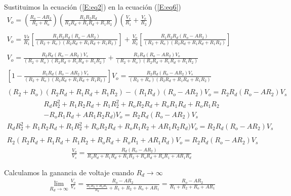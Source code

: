 \documentclass[12pt,a4paper]{article}
\begin{document}
	Sustituimos la ecuación (\ref{E:eq2}) en la ecuación (\ref{E:eq6})
	\begin{align}
		\label{E:eq}
		V_o = \left( \frac{R_o - AR_2}{R_2 + R_o} \right)\left( \frac{ R_1R_2R_d }{ R_2R_d + R_1R_d + R_1R_2 } \right)  \left( \frac{V_s}{R_1} + \frac{V_o}{R_2}\right)\nonumber\\\nonumber\\
		V_o = \frac{Vs}{R_1}\left[\frac{R_1R_2R_d(R_o - AR_2)}{(R_2 + R_o)(R_2R_d + R_1R_d + R_1R_2)}\right] + \frac{V_o}{R_2}\left[\frac{R_1R_2R_d(R_o - AR_2)}{(R_2 + R_o)(R_2R_d + R_1R_d + R_1R_2)}\right]\nonumber\\\nonumber\\
		V_o = \frac{R_2R_d(R_o - AR_2)V_s}{(R_2 + R_o)(R_2R_d + R_1R_d + R_1R_2)} + \frac{R_1R_d(R_o - AR_2)V_o}{(R_2 + R_o)(R_2R_d + R_1R_d + R_1R_2)}\nonumber\\\nonumber\\
		\left[ 1 - \frac{R_1R_d(R_o - AR_2)V_s}{(R_2 + R_o)(R_2R_d + R_1R_d + R_1R_2)} \right]V_o = \frac{R_2R_d(R_o - AR_2)V_s}{(R_2 + R_o)(R_2R_d + R_1R_d + R_1R_2)}\nonumber\\\nonumber\\
		(R_2 + R_o)(R_2R_d + R_1R_d + R_1R_2) - (R_1R_d)(R_o - AR_2)V_o = R_2R_d(R_o - AR_2)V_s\nonumber
	\end{align}
	\begin{multline*}
		R_dR_2^{2} + R_1R_2R_d + R_1R_2^{2} + R_oR_2R_d + R_oR_1R_d + R_oR_1R_2\\ - R_oR_1R_d + AR_1R_2R_d)V_o = R_2R_d(R_o - AR_2)V_s
	\end{multline*}
	\begin{align}
		R_dR_2^{2} + R_1R_2R_d + R_1R_2^{2} + R_oR_2R_d + R_oR_1R_2 + AR_1R_2R_d)V_o = R_2R_d(R_o - AR_2)V_s\nonumber\\\nonumber\\
		R_2(R_2R_d + R_1R_d + R_1R_2 + R_oR_d + R_oR_1 + AR_1R_d)V_o = R_2R_d(R_o - AR_2)V_s\nonumber
	\end{align}
	\begin{align}
		\frac{V_o}{V_s} = \frac{R_d(R_o - AR_2)}{R_2R_d + R_1R_d + R_1R_2 + R_oR_d + R_oR_1 + AR_1R_d}
	\end{align}

	\vspace{0.5cm}
	
	Calculamos la ganancia de voltaje cuando $R_d \rightarrow \infty$
	\begin{align}
		\lim_{R_d \to \infty} \frac{V_o}{V_s} = \frac{R_o - AR_2}{\frac{R_1R_2 + R_oR_1}{R_d} + R_1 +R_2 + R_o + AR_1} = \frac{R_o - AR_2}{R_1 + R_2	+ R_o + AR_1}
	\end{align}
	 
\end{document}
